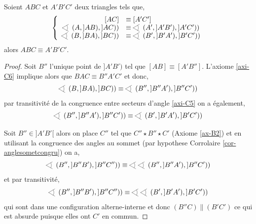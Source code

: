 \begin{lem}\label{lem-congrutriang}
    Soient $ABC$ et $A'B'C'$ deux triangles tels que,
    \begin{equation*}
        \left\{
        \begin{array}{rl}
             [AC]&\equiv [A'C']  \\
             \anglesaillant \left(A,]AB),]AC)\right)&\equiv \anglesaillant \left(A',]A'B'),]A'C')\right) \\
             \anglesaillant \left(B,]BA),]BC)\right)&\equiv \anglesaillant \left(B',]B'A'),]B'C')\right)
        \end{array}
        \right.
    \end{equation*}
    alors $ABC\equiv A'B'C'$.
\begin{proof}
    Soit $B''$ l'unique point de $]A'B')$ tel que $[AB]\equiv [A'B'']$. L'axiome \ref{axi-C6} implique alors que $BAC \equiv B'' A' C'$ et donc,
    \begin{equation*}
        \anglesaillant \left(B,]BA),]BC)\right) \equiv \anglesaillant \left(B'',]B''A'),]B''C')\right)
    \end{equation*}
    par transitivité de la congruence entre secteurs d'angle \ref{axi-C5} on a également,
    \begin{equation*}
        \anglesaillant \left(B'',]B''A'),]B''C')\right) \equiv \anglesaillant \left(B',]B'A'),]B'C')\right)
    \end{equation*}  

    Soit $B'' \in ]A'B'[$ alors on place $C''$ tel que $C'' \star B'' \star C'$ (Axiome \ref{ax-B2}) et en utilisant la congruence des angles au sommet (par hypothese Corrolaire \ref{cor-anglesometcongru}) on a,
    \begin{equation*}
        \anglesaillant \left(B'',]B''B'),]B''C'')\right) \equiv \anglesaillant \anglesaillant \left(B'',]B''A'),]B''C')\right)
    \end{equation*}
    et par transitivité,
    \begin{equation*}
        \anglesaillant \left(B'',]B''B'),]B''C'')\right) \equiv \anglesaillant \anglesaillant \left(B',]B'A'),]B'C')\right)
    \end{equation*}    
    qui sont dans une configuration alterne-interne et donc $(B'' C)\| (B'C')$ ce qui est absurde puisque elles ont $C'$ en commun.  
    

\end{proof}
\end{lem}
